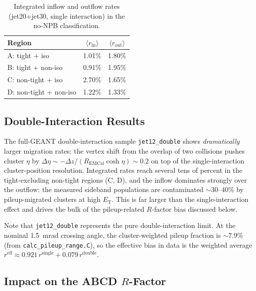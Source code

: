 \documentclass[11pt,letterpaper]{article}
\newcommand{\ET}{\ensuremath{E_{\text{T}}}}
\begin{document}
\begin{table}[htbp]
  \centering
  \caption{Integrated inflow and outflow rates (jet20+jet30, single interaction)
    in the no-NPB classification.}
  \label{tab:bkg_flow_single}
  \begin{tabular}{lcc}
    \toprule
    Region & $\langle r_\text{in} \rangle$ & $\langle r_\text{out} \rangle$ \\
    \midrule
    A: tight + iso        & 1.01\% & 1.80\% \\
    B: tight + non-iso    & 0.91\% & 1.95\% \\
    C: non-tight + iso    & 2.70\% & 1.65\% \\
    D: non-tight + non-iso & 1.22\% & 1.33\% \\
    \bottomrule
  \end{tabular}
\end{table}

\subsection{Double-Interaction Results}
\label{subsec:bkg_flow_double}

The full-GEANT double-interaction sample \texttt{jet12\_double} shows
\emph{dramatically} larger migration rates: the vertex shift from the overlap
of two collisions pushes cluster $\eta$ by
$\Delta\eta \sim -\Delta z / (R_\text{EMCal} \cosh \eta) \sim 0.2$ on top of
the single-interaction cluster-position resolution. Integrated rates reach
several tens of percent in the tight-excluding non-tight regions (C, D), and
the inflow dominates strongly over the outflow:
the measured sideband populations are contaminated $\sim 30$--$40\%$ by
pileup-migrated clusters at high $\ET$. This is far larger than the
single-interaction effect and drives the bulk of the pileup-related $R$-factor
bias discussed below.

Note that \texttt{jet12\_double} represents the pure double-interaction limit.
At the nominal 1.5~mrad crossing angle, the cluster-weighted pileup fraction is
${\sim}7.9\%$ (from \texttt{calc\_pileup\_range.C}), so the effective bias in
data is the weighted average
$r^\text{eff} \approx 0.921 \, r^\text{single} + 0.079 \, r^\text{double}$.

\subsection{Impact on the ABCD $R$-Factor}
\label{subsec:bkg_rfactor}
\end{document}
